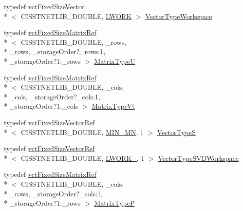 \begin{DoxyCompactItemize}
\item 
typedef \hyperlink{classvct_fixed_size_vector}{vct\-Fixed\-Size\-Vector}\\*
$<$ C\-I\-S\-S\-T\-N\-E\-T\-L\-I\-B\-\_\-\-D\-O\-U\-B\-L\-E, \hyperlink{classnmr_p_inverse_fixed_size_data_a9b39b6a640dc1ecb63ee29b568ef8bdaac2833dfeeaa50db019a1f393c7b43f6d}{L\-W\-O\-R\-K} $>$ \hyperlink{classnmr_p_inverse_fixed_size_data_a801f15c74e8a0884df8cbee5fe0ed052}{Vector\-Type\-Workspace}
\item 
typedef \hyperlink{classvct_fixed_size_matrix_ref}{vct\-Fixed\-Size\-Matrix\-Ref}\\*
$<$ C\-I\-S\-S\-T\-N\-E\-T\-L\-I\-B\-\_\-\-D\-O\-U\-B\-L\-E, \-\_\-rows, \\*
\-\_\-rows, \-\_\-storage\-Order?\-\_\-rows\-:1, \\*
\-\_\-storage\-Order?1\-:\-\_\-rows $>$ \hyperlink{classnmr_p_inverse_fixed_size_data_aef6864d119646cca01fc7a27d9eec4fa}{Matrix\-Type\-U}
\item 
typedef \hyperlink{classvct_fixed_size_matrix_ref}{vct\-Fixed\-Size\-Matrix\-Ref}\\*
$<$ C\-I\-S\-S\-T\-N\-E\-T\-L\-I\-B\-\_\-\-D\-O\-U\-B\-L\-E, \-\_\-cols, \\*
\-\_\-cols, \-\_\-storage\-Order?\-\_\-cols\-:1, \\*
\-\_\-storage\-Order?1\-:\-\_\-cols $>$ \hyperlink{classnmr_p_inverse_fixed_size_data_a61bc7c8325cf61f5c530759364ce185a}{Matrix\-Type\-Vt}
\item 
typedef \hyperlink{classvct_fixed_size_vector_ref}{vct\-Fixed\-Size\-Vector\-Ref}\\*
$<$ C\-I\-S\-S\-T\-N\-E\-T\-L\-I\-B\-\_\-\-D\-O\-U\-B\-L\-E, \hyperlink{classnmr_p_inverse_fixed_size_data_a00763e211eaac400820a79a1637c7b88adf9d8cea78dd81b86e5831a9239a5fa4}{M\-I\-N\-\_\-\-M\-N}, 1 $>$ \hyperlink{classnmr_p_inverse_fixed_size_data_a55ba424dddf7bd0797b80bc468a209b0}{Vector\-Type\-S}
\item 
typedef \hyperlink{classvct_fixed_size_vector_ref}{vct\-Fixed\-Size\-Vector\-Ref}\\*
$<$ C\-I\-S\-S\-T\-N\-E\-T\-L\-I\-B\-\_\-\-D\-O\-U\-B\-L\-E, \hyperlink{classnmr_p_inverse_fixed_size_data_ab1276f85c8bba0fd1b6864e1c77adf55a984bafe542256ba33b6e9d1c533c5613}{L\-W\-O\-R\-K\-\_}, 1 $>$ \hyperlink{classnmr_p_inverse_fixed_size_data_aedbceacb820ab99ce724431b6f38d56e}{Vector\-Type\-S\-V\-D\-Workspace}
\item 
typedef \hyperlink{classvct_fixed_size_matrix_ref}{vct\-Fixed\-Size\-Matrix\-Ref}\\*
$<$ C\-I\-S\-S\-T\-N\-E\-T\-L\-I\-B\-\_\-\-D\-O\-U\-B\-L\-E, \-\_\-cols, \\*
\-\_\-rows, \-\_\-storage\-Order?\-\_\-cols\-:1, \\*
\-\_\-storage\-Order?1\-:\-\_\-rows $>$ \hyperlink{classnmr_p_inverse_fixed_size_data_abbeb86284eb856bc18f108e80906b04d}{Matrix\-Type\-P}
\end{DoxyCompactItemize}
